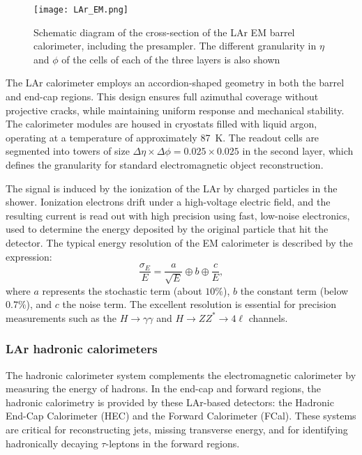 \begin{figure}[htbp]
    \centering
        \texttt{[image: LAr\_EM.png]}
    \caption{Schematic diagram of the cross-section of the LAr EM barrel calorimeter, including the presampler. The different granularity in $\eta$ and $\phi$ of the cells of each of the three layers is also shown~\cite{atlas:EM_LAr}}
    \label{fig:LAr_EM}
\end{figure}

The LAr calorimeter employs an accordion-shaped geometry in both the barrel and end-cap regions. This design ensures full azimuthal coverage without projective cracks, while maintaining uniform response and mechanical stability. The calorimeter modules are housed in cryostats filled with liquid argon, operating at a temperature of approximately 87~K. The readout cells are segmented into towers of size $\Delta\eta \times \Delta\phi = 0.025 \times 0.025$ in the second layer, which defines the granularity for standard electromagnetic object reconstruction.

The signal is induced by the ionization of the LAr by charged particles in the shower. Ionization electrons drift under a high-voltage electric field, and the resulting current is read out with high precision using fast, low-noise electronics, used to determine the energy deposited by the original particle that hit the detector. The typical energy resolution of the EM calorimeter is described by the expression:
\begin{equation}
\frac{\sigma_E}{E} = \frac{a}{\sqrt{E}} \oplus b \oplus \frac{c}{E},
\end{equation}
where $a$ represents the stochastic term (about $10\%$), $b$ the constant term (below $0.7\%$), and $c$ the noise term. The excellent resolution is essential for precision measurements such as the $H \rightarrow \gamma\gamma$ and $H \rightarrow ZZ^* \rightarrow 4\ell$ channels.

\subsubsection{LAr hadronic calorimeters}
\label{sec:elehad}

The hadronic calorimeter system complements the electromagnetic calorimeter by measuring the energy of hadrons. In the end-cap and forward regions, the hadronic calorimetry is provided by these LAr-based detectors: the Hadronic End-Cap Calorimeter (HEC) and the Forward Calorimeter (FCal). These systems are critical for reconstructing jets, missing transverse energy, and for identifying hadronically decaying $\tau$-leptons in the forward regions.

